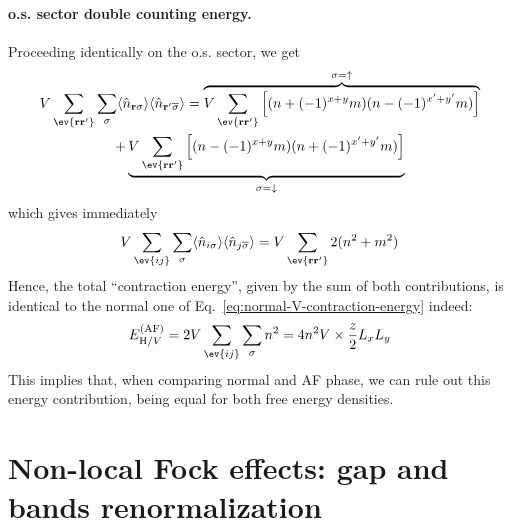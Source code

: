 \paragraph{o.s. sector double counting energy.}

Proceeding identically on the o.s. sector, we get
\begin{multline*}
	V \sum_{\ev{\mathbf{r}\mathbf{r}'}} \sum_\sigma \langle
		\hat n_{\mathbf{r}\sigma}
	\rangle \langle
		\hat n_{\mathbf{r}'\overline{\sigma}}
	\rangle = \overbrace{
		V \sum_{\ev{\mathbf{r}\mathbf{r}'}} \left[
			(
				n + (-1)^{x+y} m
			) (
				n - (-1)^{x'+y'} m
			)
		\right]
	}^{\sigma=\uparrow} \\
	+ \underbrace{
		V \sum_{\ev{\mathbf{r}\mathbf{r}'}} \left[
			(
				n - (-1)^{x+y} m
			) (
				n + (-1)^{x'+y'} m
			)
		\right]
	}_{\sigma=\downarrow}
\end{multline*}
which gives immediately
\[
	V \sum_{\ev{ij}} \sum_\sigma \langle
		\hat n_{i\sigma}
	\rangle \langle
		\hat n_{j\overline{\sigma}}
	\rangle = V \sum_{\ev{\mathbf{r}\mathbf{r}'}} 2(
		n^2+m^2
	)
\]
Hence, the total ``contraction energy'', given by the sum of both contributions, is identical to the normal one of Eq.~\eqref{eq:normal-V-contraction-energy} indeed:
\begin{equation}\label{eq:af-hartree-V-contraction-energy}
	E_{\mathrm{H}/V}^{(\mathrm{AF})} = 2V \sum_{\ev{ij}} \sum_\sigma n^2 = 4n^2 V \times \frac{z}{2} L_x L_y
\end{equation}
This implies that, when comparing normal and AF phase, we can rule out this energy contribution, being equal for both free energy densities.

\section{Non-local Fock effects: gap and bands renormalization}\label{sec:af-fock-bands-renormalization}

